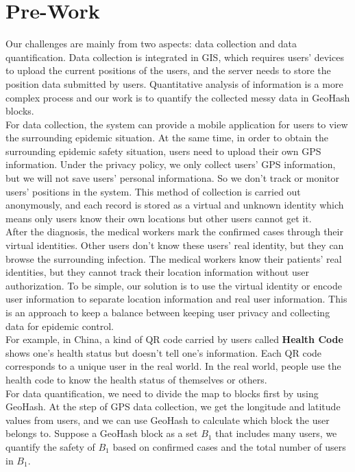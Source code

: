 \documentclass[sigplan,screen]{acmart}
\begin{document}
\section{Pre-Work}
Our challenges are mainly from two aspects: data collection and data quantification.
Data collection is integrated in GIS, which requires users' devices to upload the current positions of the users, and the server needs to store the position data submitted by users.
Quantitative analysis of information is a more complex process and our work is to quantify the collected messy data in GeoHash blocks.
\\
For data collection, the system can provide a mobile application for users to view the surrounding epidemic situation.
At the same time, in order to obtain the surrounding epidemic safety situation, users need to upload their own GPS information.
Under the privacy policy, we only collect users' GPS information, but we will not save users' personal informationa. So we don't track or monitor users' positions in the system.
This method of collection is carried out anonymously, and each record is stored as a virtual and unknown identity which means only users know their own locations but other users cannot get it.
\\
After the diagnosis, the medical workers mark the confirmed cases through their virtual identities.
Other users don't know these users' real identity, but they can browse the surrounding infection.
The medical workers know their patients' real identities, but they cannot track their location information without user authorization.
To be simple, our solution is to use the virtual identity or encode user information to separate location information and real user information.
This is an approach to keep a balance between keeping user privacy and collecting data for epidemic control.
\\
For example, in China, a kind of QR code carried by users called \textbf{Health Code} shows one's health status but doesn't tell one's information.
Each QR code corresponds to a unique user in the real world.
In the real world, people use the health code to know the health status of themselves or others.
\\
For data quantification, we need to divide the map to blocks first by using GeoHash.
At the step of GPS data collection, we get the longitude and latitude values from users, and we can use GeoHash to calculate which block the user belongs to.
Suppose a GeoHash block as a set $B_1$ that includes many users, we quantify the safety of $B_1$ based on confirmed cases and the total number of users in $B_1$.
\end{document}

